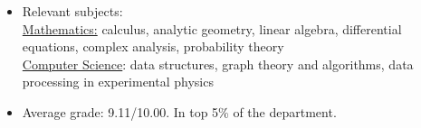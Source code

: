 \begin{itemize}
\item Relevant subjects: \\
	\underline{Mathematics:} calculus, analytic geometry, linear algebra, differential equations, complex analysis, probability theory\\
	\underline{Computer Science}: data structures, graph theory and algorithms, data processing in experimental physics \\
\item Average grade: 9.11/10.00. In top 5\% of the department.
\end{itemize}
